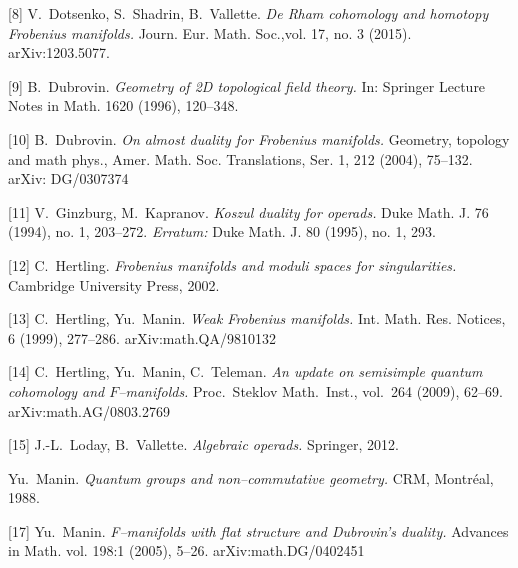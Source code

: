 {\smallskip

[8]   V.~Dotsenko, S.~Shadrin, B.~Vallette. {\it De Rham cohomology and
homotopy Frobenius manifolds.} Journ. Eur. Math. Soc.,vol. 17, no. 3 (2015). arXiv:1203.5077.

\smallskip

[9]   B.~Dubrovin. {\it Geometry of 2D topological field theory.}
In: Springer Lecture Notes in Math. 1620 (1996), 120--348.

\smallskip

[10]   B.~Dubrovin. {\it On almost duality for Frobenius manifolds.}
Geometry, topology and math phys., Amer. Math. Soc. Translations, Ser. 1, 212 (2004), 75--132.
arXiv: DG/0307374

 \smallskip
 
 [11]    V.~Ginzburg, M.~Kapranov. {\it Koszul duality for operads.}
 Duke Math. J. 76 (1994), no. 1, 203--272. {\it Erratum:}
 Duke Math. J. 80 (1995), no. 1, 293.
 
 \smallskip

[12]  C.~Hertling. {\it Frobenius manifolds and moduli spaces for singularities.}
Cambridge University Press, 2002.

\smallskip

[13]   C.~Hertling, Yu.~Manin. {\it Weak Frobenius manifolds.}
Int. Math. Res. Notices, 6 (1999), 277--286. 
arXiv:math.QA/9810132

\smallskip

[14]   C.~Hertling, Yu.~Manin, C.~Teleman. {\it An update on semisimple quantum cohomology
and $F$--manifolds.} Proc.~Steklov  Math.~Inst., vol.~264 (2009), 62--69. arXiv:math.AG/0803.2769





\smallskip
 
 [15]  J.-L.~Loday, B.~Vallette. {\it Algebraic operads.} Springer, 2012.



\smallskip
[16]  Yu.~Manin.  {\it Quantum groups and non--commutative geometry.}
CRM, Montr\'eal, 1988.  

\smallskip

[17]   Yu.~Manin. {\it F--manifolds with flat structure and
Dubrovin's duality.} Advances in Math. vol. 198:1 (2005), 5--26.  arXiv:math.DG/0402451

}
